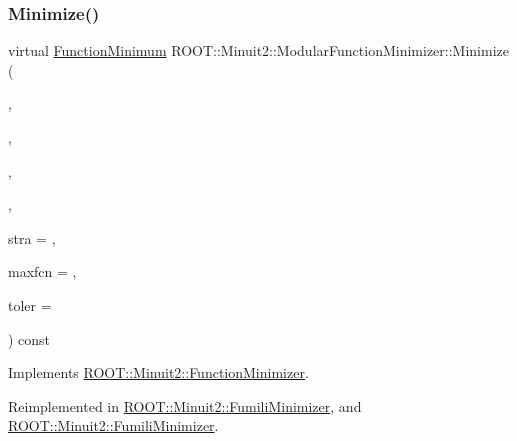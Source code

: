 \subsubsection{\texorpdfstring{Minimize()}{Minimize()}\hspace{0.1cm}{\footnotesize\ttfamily [8/22]}}
{\footnotesize\ttfamily virtual \mbox{\hyperlink{classROOT_1_1Minuit2_1_1FunctionMinimum}{Function\+Minimum}} R\+O\+O\+T\+::\+Minuit2\+::\+Modular\+Function\+Minimizer\+::\+Minimize (\begin{DoxyParamCaption}\item[{const \mbox{\hyperlink{classROOT_1_1Minuit2_1_1FCNGradientBase}{F\+C\+N\+Gradient\+Base}} \&}]{,  }\item[{const std\+::vector$<$ double $>$ \&}]{,  }\item[{unsigned int}]{,  }\item[{const std\+::vector$<$ double $>$ \&}]{,  }\item[{unsigned int}]{stra = {},  }\item[{unsigned int}]{maxfcn = {},  }\item[{double}]{toler = {} }\end{DoxyParamCaption}) const\hspace{0.3cm}{\ttfamily [virtual]}}



Implements \mbox{\hyperlink{classROOT_1_1Minuit2_1_1FunctionMinimizer_a467a9dd60665c9b31969fe55d73b6401}{R\+O\+O\+T\+::\+Minuit2\+::\+Function\+Minimizer}}.



Reimplemented in \mbox{\hyperlink{classROOT_1_1Minuit2_1_1FumiliMinimizer_aa17be65e26311aa25f6fd3680f747958}{R\+O\+O\+T\+::\+Minuit2\+::\+Fumili\+Minimizer}}, and \mbox{\hyperlink{classROOT_1_1Minuit2_1_1FumiliMinimizer_aa17be65e26311aa25f6fd3680f747958}{R\+O\+O\+T\+::\+Minuit2\+::\+Fumili\+Minimizer}}.

\mbox{\label{classROOT_1_1Minuit2_1_1ModularFunctionMinimizer_a194ce8da431014aa6a2b45ede2a53391}} 
